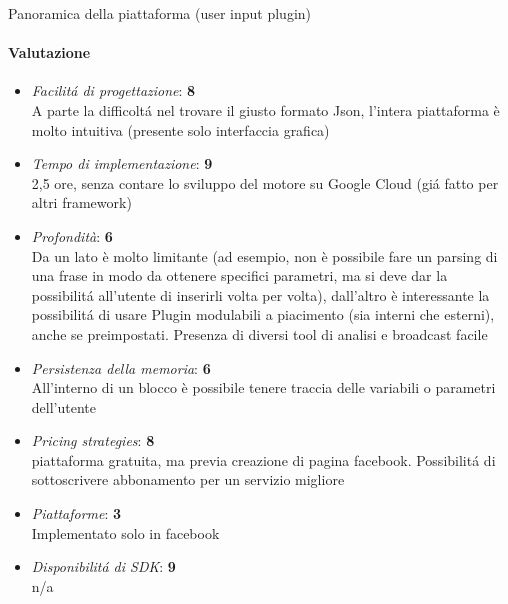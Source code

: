 \documentclass[]{article}
\begin{document}
\begin{center}
\footnotesize{Panoramica della piattaforma (user input plugin)}
\end{center}

\paragraph{Valutazione}
\begin{itemize}
\item \textit{Facilitá di progettazione}: \textbf{8} \\ A parte la difficoltá nel trovare il giusto formato Json, l’intera piattaforma è molto intuitiva (presente solo interfaccia grafica)
\item \textit{Tempo di implementazione}: \textbf{9} \\ 2,5 ore, senza contare lo sviluppo del motore su Google Cloud (giá fatto per altri framework)
\item \textit{Profondità}: \textbf{6} \\ Da un lato è molto limitante (ad esempio, non è possibile fare un parsing di una frase in modo da ottenere specifici parametri, ma si deve dar la possibilitá all’utente di inserirli volta per volta), dall’altro è interessante la possibilitá di usare Plugin modulabili a piacimento (sia interni che esterni), anche se preimpostati. Presenza di diversi tool di analisi e broadcast facile
\item \textit{Persistenza della memoria}: \textbf{6} \\  All’interno di un blocco è possibile tenere traccia delle variabili o parametri dell’utente
\item \textit{Pricing strategies}: \textbf{8} \\  piattaforma gratuita, ma previa creazione di pagina facebook. Possibilitá di sottoscrivere abbonamento per un servizio migliore
\item \textit{Piattaforme}: \textbf{3} \\ Implementato solo in facebook
\item \textit{Disponibilitá di SDK}: \textbf{9} \\ n/a
\end{itemize}
\end{document}
